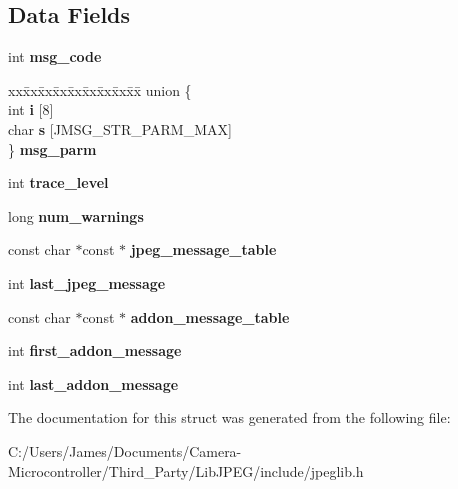 \subsection*{Data Fields}
\begin{DoxyCompactItemize}
\item 
\mbox{\label{structjpeg__error__mgr_ad6ade3e336c32f7e17f1d5d008299ce4}} 
int {\bfseries msg\+\_\+code}
\item 
\mbox{\label{structjpeg__error__mgr_a271d8836513226e685b4858ad3068ef9}} 
\begin{tabbing}
xx\=xx\=xx\=xx\=xx\=xx\=xx\=xx\=xx\=\kill
union \{\\
\>int {\bfseries i} \mbox{[}8\mbox{]}\\
\>char {\bfseries s} \mbox{[}JMSG\_STR\_PARM\_MAX\mbox{]}\\
\} {\bfseries msg\_parm}\\

\end{tabbing}\item 
\mbox{\label{structjpeg__error__mgr_a5a9bb49b93f61cb0227d351713cfe8ea}} 
int {\bfseries trace\+\_\+level}
\item 
\mbox{\label{structjpeg__error__mgr_a102ca7eee046f7755e58cc06c98d3717}} 
long {\bfseries num\+\_\+warnings}
\item 
\mbox{\label{structjpeg__error__mgr_aad9c671fbd6a86f22d3ec0f08ade8062}} 
const char $\ast$const  $\ast$ {\bfseries jpeg\+\_\+message\+\_\+table}
\item 
\mbox{\label{structjpeg__error__mgr_a4aed1a44cf42578bfdc886cceeb373a9}} 
int {\bfseries last\+\_\+jpeg\+\_\+message}
\item 
\mbox{\label{structjpeg__error__mgr_a6df0306d10dc559dc3732f9c3cd30096}} 
const char $\ast$const  $\ast$ {\bfseries addon\+\_\+message\+\_\+table}
\item 
\mbox{\label{structjpeg__error__mgr_a788ee77db4c9a5ae6ca7130e6b22222b}} 
int {\bfseries first\+\_\+addon\+\_\+message}
\item 
\mbox{\label{structjpeg__error__mgr_a8032b6191616d1c2864901939aa9c1ec}} 
int {\bfseries last\+\_\+addon\+\_\+message}
\end{DoxyCompactItemize}


The documentation for this struct was generated from the following file\+:\begin{DoxyCompactItemize}
\item 
C\+:/\+Users/\+James/\+Documents/\+Camera-\/\+Microcontroller/\+Third\+\_\+\+Party/\+Lib\+J\+P\+E\+G/include/jpeglib.\+h\end{DoxyCompactItemize}
